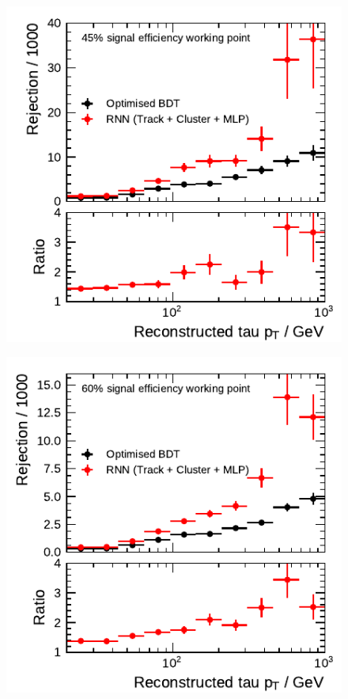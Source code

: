 \noindent
\begin{minipage}{\textwidth}
  \captionsetup{type=figure}
  \centering
  \begin{subfigure}[t]{0.48\textwidth}
    \centering
    \includegraphics{./figures/rnn/combined/highpt/rnn_tight_3p.pdf}
  \end{subfigure}\hfill
  \begin{subfigure}[t]{0.48\textwidth}
    \centering
    \includegraphics{./figures/rnn/combined/highpt/rnn_medium_3p.pdf}

\end{subfigure}
\end{minipage}
